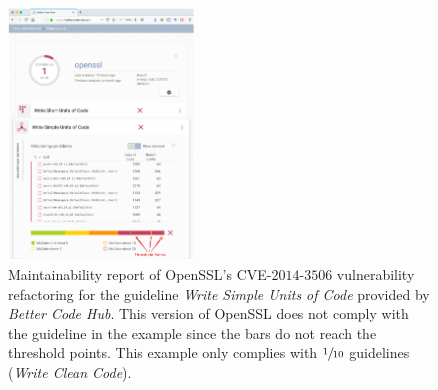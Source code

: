 \documentclass[10pt,conference]{IEEEtran}
\begin{document}
\begin{figure}[h]
 	\centering 	\includegraphics[width=0.44\textwidth]{figures/bch_report.png}
 	\caption{Maintainability report of OpenSSL's CVE-$2014$-$3506$ vulnerability
refactoring for the guideline \emph{Write Simple Units of Code} provided by
\emph{Better Code Hub}. This version of OpenSSL does not comply with the
guideline in the example since the bars do not reach the threshold points. This
example only complies with $\sfrac{1}{10}$ guidelines (\emph{Write Clean Code}).}
	\label{fig:bchrep}
\end{figure}
\end{document}
